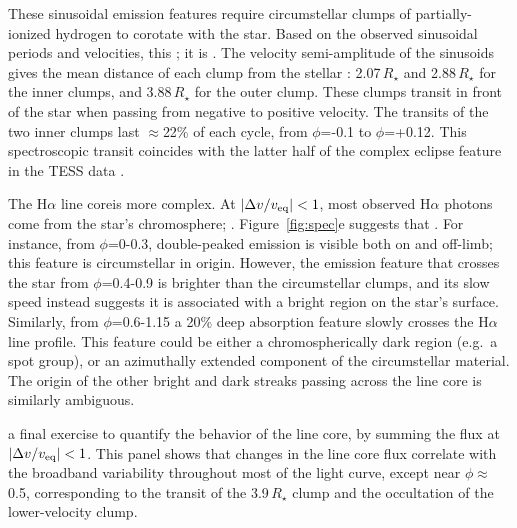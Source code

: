 \documentclass[11pt,twocolumn,tighten,linenumbers]{aastex7}
\begin{document}
These sinusoidal emission features require circumstellar clumps of
partially-ionized hydrogen to corotate with the star.  Based on the
observed sinusoidal periods and velocities, this ; it is .  The velocity semi-amplitude of the
sinusoids gives the mean distance of each clump from the stellar
: 2.07\,$R_\star$ and 2.88\,$R_\star$ for the
inner clumps, and 3.88\,$R_\star$ for the outer clump.   These clumps
transit in front of the star when passing from negative to positive
velocity.  The transits of the two inner clumps last $\approx$22\% of
each cycle, from $\phi$=-0.1 to $\phi$=+0.12.  This spectroscopic
transit coincides with the latter half of the complex eclipse feature
in the TESS data .

The H$\alpha$ line coreis more complex.  At $|\Delta v / v_{\rm
eq}|<1$, most observed H$\alpha$ photons come from the star's
chromosphere; .  Figure~\ref{fig:spec}e suggests that
.  For instance, from
$\phi$=0-0.3, double-peaked emission is visible both on and off-limb;
this feature is circumstellar in origin.  However, the emission
feature that crosses the star from $\phi$=0.4-0.9 is brighter than the
circumstellar clumps, and its slow speed instead suggests it is
associated with a bright region on the star's surface.  Similarly, from
$\phi$=0.6-1.15 a 20\% deep absorption feature slowly crosses the
H$\alpha$ line profile.  This feature could be either a
chromospherically dark region (e.g.~a spot group), or an azimuthally
extended component of the circumstellar material.  The origin of the
other bright and dark streaks passing across the line core is similarly ambiguous. 

 a final exercise to quantify the
behavior of the line core, by summing the  flux at
$|\Delta v / v_{\rm eq}|<1$.  This panel shows that changes in the
line core flux  correlate with the
broadband variability throughout most of the light curve, except near
$\phi$$\approx$0.5, corresponding to the transit of the 3.9\,$R_\star$
clump and the occultation of the lower-velocity clump.
\end{document}
